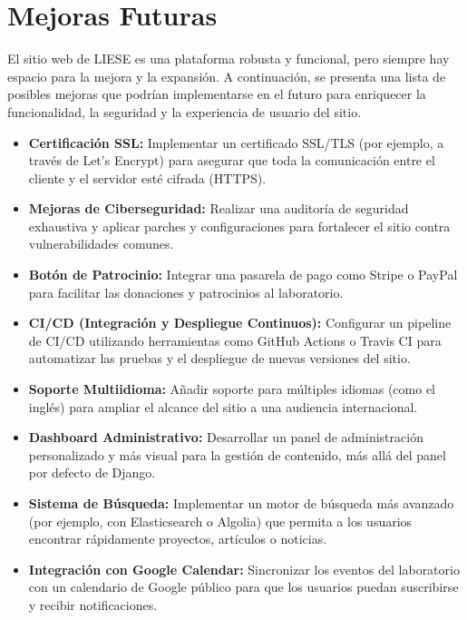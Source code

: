\chapter{Mejoras Futuras}
\label{ch:mejoras_futuras}

El sitio web de LIESE es una plataforma robusta y funcional, pero siempre hay espacio para la mejora y la expansión. A continuación, se presenta una lista de posibles mejoras que podrían implementarse en el futuro para enriquecer la funcionalidad, la seguridad y la experiencia de usuario del sitio.

\begin{itemize}
    \item \textbf{Certificación SSL:} Implementar un certificado SSL/TLS (por ejemplo, a través de Let's Encrypt) para asegurar que toda la comunicación entre el cliente y el servidor esté cifrada (HTTPS).

    \item \textbf{Mejoras de Ciberseguridad:} Realizar una auditoría de seguridad exhaustiva y aplicar parches y configuraciones para fortalecer el sitio contra vulnerabilidades comunes.

    \item \textbf{Botón de Patrocinio:} Integrar una pasarela de pago como Stripe o PayPal para facilitar las donaciones y patrocinios al laboratorio.

    \item \textbf{CI/CD (Integración y Despliegue Continuos):} Configurar un pipeline de CI/CD utilizando herramientas como GitHub Actions o Travis CI para automatizar las pruebas y el despliegue de nuevas versiones del sitio.

    \item \textbf{Soporte Multiidioma:} Añadir soporte para múltiples idiomas (como el inglés) para ampliar el alcance del sitio a una audiencia internacional.

    \item \textbf{Dashboard Administrativo:} Desarrollar un panel de administración personalizado y más visual para la gestión de contenido, más allá del panel por defecto de Django.

    \item \textbf{Sistema de Búsqueda:} Implementar un motor de búsqueda más avanzado (por ejemplo, con Elasticsearch o Algolia) que permita a los usuarios encontrar rápidamente proyectos, artículos o noticias.

    \item \textbf{Integración con Google Calendar:} Sincronizar los eventos del laboratorio con un calendario de Google público para que los usuarios puedan suscribirse y recibir notificaciones.


\end{itemize}
